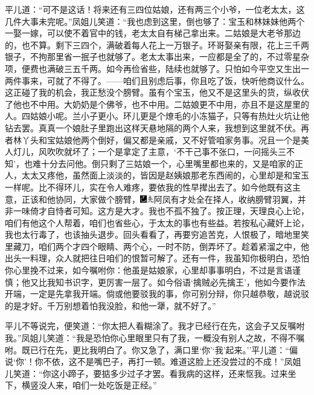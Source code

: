 平儿道：``可不是这话！将来还有三四位姑娘，还有两三个小爷，一位老太太，这几件大事未完呢。''凤姐儿笑道：``我也虑到这里，倒也够了：宝玉和林妹妹他两个一娶一嫁，可以使不着官中的钱，老太太自有梯己拿出来。二姑娘是大老爷那边的，也不算。剩下三四个，满破着每人花上一万银子。环哥娶亲有限，花上三千两银子，不拘那里省一抿子也就够了。老太太事出来，一应都是全了的，不过零星杂项，便费也满破三五千两。如今再俭省些，陆续也就够了。只怕如今平空又生出一两件事来，可就了不得了。------咱们且别虑后事，你且吃了饭，快听他商议什么。这正碰了我的机会，我正愁没个膀臂。虽有个宝玉，他又不是这里头的货，纵收伏了他也不中用。大奶奶是个佛爷，也不中用。二姑娘更不中用，亦且不是这屋里的人。四姑娘小呢。兰小子更小。环儿更是个燎毛的小冻猫子，只等有热灶火坑让他钻去罢。真真一个娘肚子里跑出这样天悬地隔的两个人来，我想到这里就不伏。再者林丫头和宝姑娘他两个倒好，偏又都是亲戚，又不好管咱家务事。况且一个是美人灯儿，风吹吹就坏了；一个是拿定了主意，`不干己事不张口，一问摇头三不知'，也难十分去问他。倒只剩了三姑娘一个，心里嘴里都也来的，又是咱家的正人，太太又疼他，虽然面上淡淡的，皆因是赵姨娘那老东西闹的，心里却是和宝玉一样呢。比不得环儿，实在令人难疼，要依我的性早撵出去了。如今他既有这主意，正该和他协同，大家做个膀臂，{\includegraphics[width=3mm]{../Images/00003}\includegraphics[width=3mm]{../Images/00012}\footnotesize \kaishu 阿凤有才处全在择人，收纳膀臂羽翼，并非一味倚才自恃者可知。这方是大才。}我也不孤不独了。按正理，天理良心上论，咱们有他这个人帮着，咱们也省些心，于太太的事也有些益。若按私心藏奸上论，我也太行毒了，也该抽头退步。回头看看了，再要穷追苦克，人恨极了，暗地里笑里藏刀，咱们两个才四个眼睛、两个心，一时不防，倒弄坏了。趁着紧溜之中，他出头一料理，众人就把往日咱们的恨暂可解了。还有一件，我虽知你极明白，恐怕你心里挽不过来，如今嘱咐你：他虽是姑娘家，心里却事事明白，不过是言语谨慎；他又比我知书识字，更厉害一层了。如今俗语`擒贼必先擒王'，他如今要作法开端，一定是先拿我开端。倘或他要驳我的事，你可别分辩，你只越恭敬，越说驳的是才好。千万别想着怕我没脸，和他一犟，就不好了。''

平儿不等说完，便笑道：``你太把人看糊涂了。我才已经行在先，这会子又反嘱咐我。''凤姐儿笑道：``我是恐怕你心里眼里只有了我，一概没有别人之故，不得不嘱咐。既已行在先，更比我明白了。你又急了，满口里`你'`我'起来。''平儿道：``偏说`你'！你不依，这不是嘴巴子，再打一顿。难道这脸上还没尝过的不成！''凤姐儿笑道：``你这小蹄子，要掂多少过子才罢。看我病的这样，还来怄我。过来坐下，横竖没人来，咱们一处吃饭是正经。''

